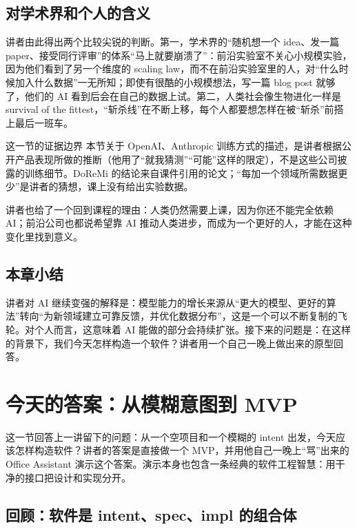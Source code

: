 \documentclass[a4paper]{article}
\begin{document}
\subsection{对学术界和个人的含义}

讲者由此得出两个比较尖锐的判断。第一，学术界的“随机想一个 idea、发一篇 paper、接受同行评审”的体系“马上就要崩溃了”：前沿实验室不关心小规模实验，因为他们看到了另一个维度的 scaling law，而不在前沿实验室里的人，对“什么时候加入什么数据”一无所知；即使有很酷的小规模想法，写一篇 blog post 就够了，他们的 AI 看到后会在自己的数据上试。第二，人类社会像生物进化一样是 survival of the fittest，“斩杀线”在不断上移，每个人都要想怎样在被“斩杀”前搭上最后一班车。

\begin{warningbox}{这一节的证据边界}
本节关于 OpenAI、Anthropic 训练方式的描述，是讲者根据公开产品表现所做的推断（他用了“就我猜测”“可能”这样的限定），不是这些公司披露的训练细节。DoReMi 的结论来自课件引用的论文；“每加一个领域所需数据更少”是讲者的猜想，课上没有给出实验数据。
\end{warningbox}

讲者也给了一个回到课程的理由：人类仍然需要上课，因为你还不能完全依赖 AI；前沿公司也都说希望靠 AI 推动人类进步，而成为一个更好的人，才能在这种变化里找到意义。

\subsection{本章小结}

讲者对 AI 继续变强的解释是：模型能力的增长来源从“更大的模型、更好的算法”转向“为新领域建立可靠反馈，并优化数据分布”，这是一个可以不断复制的飞轮。对个人而言，这意味着 AI 能做的部分会持续扩张。接下来的问题是：在这样的背景下，我们今天怎样构造一个软件？讲者用一个自己一晚上做出来的原型回答。

\section{今天的答案：从模糊意图到 MVP}

这一节回答上一讲留下的问题：从一个空项目和一个模糊的 intent 出发，今天应该怎样构造软件？讲者的答案是直接做一个 MVP，并用他自己一晚上“骂”出来的 Office Assistant 演示这个答案。演示本身也包含一条经典的软件工程智慧：用干净的接口把设计和实现分开。

\subsection{回顾：软件是 intent、spec、impl 的组合体}
\end{document}
